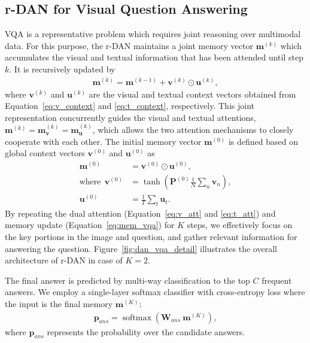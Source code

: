\documentclass[10pt,twocolumn,letterpaper]{article}
\begin{document}
\subsection{r-DAN for Visual Question Answering}
\label{sub:vqa}
VQA is a representative problem which requires joint reasoning over multimodal data.
For this purpose, the r-DAN maintains a joint memory vector $\mathbf{m}^{(k)}$ which accumulates the visual and textual information that has been attended until step $k$.
It is recursively updated by 
\begin{align}
\mathbf{m}^{(k)} = \mathbf{m}^{(k-1)} + \mathbf{v}^{(k)} \odot \mathbf{u}^{(k)},
\label{eq:mem_vqa}
\end{align}
where $\mathbf{v}^{(k)}$ and $\mathbf{u}^{(k)}$ are the visual and textual context vectors obtained from Equation~\ref{eq:v_context} and \ref{eq:t_context}, respectively.
This joint representation concurrently guides the visual and textual attentions, \ie $\mathbf{m}^{(k)} = \mathbf{m}_\mathbf{v}^{(k)} = \mathbf{m}_\mathbf{u}^{(k)}$, which allows the two attention mechanisms to closely cooperate with each other.
The initial memory vector $\mathbf{m}^{(0)}$ is defined based on global context vectors $\mathbf{v}^{(0)}$ and $\mathbf{u}^{(0)}$ as
\begin{align}
\mathbf{m}^{(0)} &= \mathbf{v}^{(0)} \odot \mathbf{u}^{(0)}, \\
\text{where}~~
\mathbf{v}^{(0)} &= \tanh \left( \mathbf{P}^{(0)} \frac{1}{N} \sum_{n}{\mathbf{v}_n} \right), 
\label{eq:initial_v} \\
\mathbf{u}^{(0)} &= \frac{1}{T} \sum_{t}{\mathbf{u}_t}.
\label{eq:initial_u}
\end{align}
By repeating the dual attention (Equation~\ref{eq:v_att} and \ref{eq:t_att}) and memory update (Equation~\ref{eq:mem_vqa}) for $K$ steps, we effectively focus on the key portions  in the image and question, and gather relevant information for answering the question.
Figure~\ref{fig:dan_vqa_detail} illustrates the overall architecture of r-DAN in case of $K=2$.

The final answer is predicted by multi-way classification to the top $C$ frequent answers.
We employ a single-layer softmax classifier with cross-entropy loss where the input is the final memory $\mathbf{m}^{(K)}$:
\begin{align}
\mathbf{p}_{ans} = \operatorname{softmax} \left( \mathbf{W}_{ans}~\mathbf{m}^{(K)} \right),
\end{align}
where $\mathbf{p}_{ans}$ represents the probability over the candidate answers.
\end{document}
